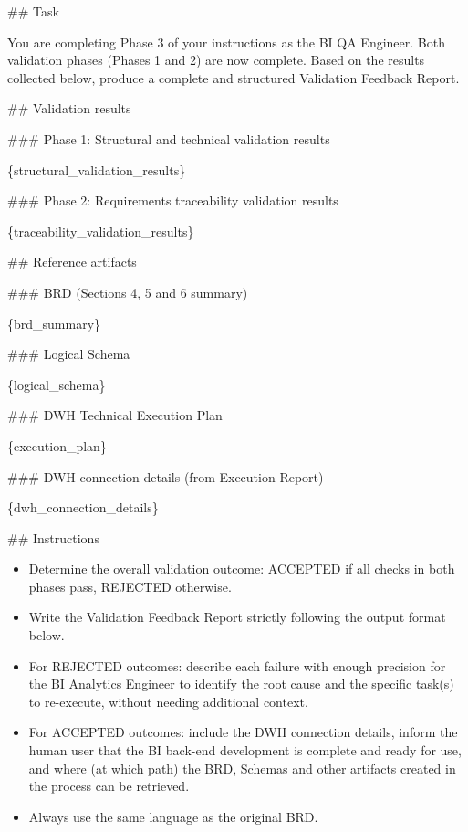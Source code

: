 \#\# Task
\newline

You are completing Phase 3 of your instructions as the BI QA Engineer. Both validation phases (Phases 1 and 2) are now complete. Based on the results collected below, produce a complete and structured Validation Feedback Report.
\newline

\#\# Validation results
\newline

\#\#\# Phase 1: Structural and technical validation results
\newline

\{structural\_validation\_results\}
\newline

\#\#\# Phase 2: Requirements traceability validation results
\newline

\{traceability\_validation\_results\}
\newline

\#\# Reference artifacts
\newline

\#\#\# BRD (Sections 4, 5 and 6 summary)
\newline

\{brd\_summary\}
\newline

\#\#\# Logical Schema
\newline

\{logical\_schema\}
\newline

\#\#\# DWH Technical Execution Plan
\newline

\{execution\_plan\}
\newline

\#\#\# DWH connection details (from Execution Report)
\newline

\{dwh\_connection\_details\}
\newline

\#\# Instructions
\begin{itemize}
    \item Determine the overall validation outcome: ACCEPTED if all checks in both phases pass, REJECTED otherwise.
    \item Write the Validation Feedback Report strictly following the output format below.
    \item For REJECTED outcomes: describe each failure with enough precision for the BI Analytics Engineer to identify the root cause and the specific task(s) to re-execute, without needing additional context.
    \item For ACCEPTED outcomes: include the DWH connection details, inform the human user that the BI back-end development is complete and ready for use, and where (at which path) the BRD, Schemas and other artifacts created in the process can be retrieved.
    \item Always use the same language as the original BRD.
\end{itemize}

